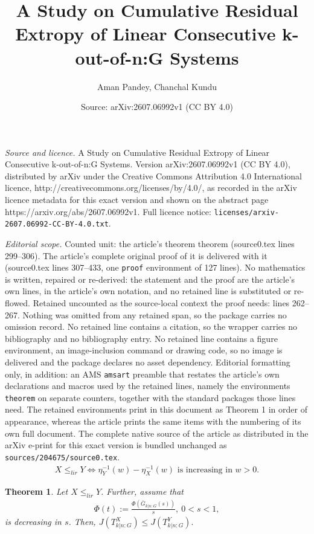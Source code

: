 \documentclass[10pt,a4paper]{amsart}
\title{A Study on Cumulative Residual Extropy of Linear Consecutive k-out-of-n:G Systems}
\author{Aman Pandey, Chanchal Kundu}
\date{Source: arXiv:2607.06992v1 (CC BY 4.0)}
\newtheorem{theorem}{Theorem}
\begin{document}
\maketitle

\noindent\emph{Source and licence.} A Study on Cumulative Residual Extropy of Linear Consecutive k-out-of-n:G Systems. Version arXiv:2607.06992v1 (CC BY 4.0), distributed by arXiv under the Creative Commons Attribution 4.0 International licence, http://creativecommons.org/licenses/by/4.0/, as recorded in the arXiv licence metadata for this exact version and shown on the abstract page https://arxiv.org/abs/2607.06992v1. Full licence notice: \texttt{licenses/arxiv-2607.06992-CC-BY-4.0.txt}.\par\smallskip

\noindent\textit{Editorial scope.} Counted unit: the article's theorem theorem (source0.tex lines 299--306). The article's complete original proof of it is delivered with it (source0.tex lines 307--433, one \texttt{proof} environment of 127 lines). No mathematics is written, repaired or re-derived: the statement and the proof are the article's own lines, in the article's own notation, and no retained line is substituted or re-flowed.  Retained uncounted as the source-local context the proof needs: lines 262--267.  Nothing was omitted from any retained span, so the package carries no omission record.  No retained line contains a citation, so the wrapper carries no bibliography and no bibliography entry.  No retained line contains a figure environment, an image-inclusion command or drawing code, so no image is delivered and the package declares no asset dependency.  Editorial formatting only, in addition: an AMS \texttt{amsart} preamble that restates the article's own declarations and macros used by the retained lines, namely the environments \texttt{theorem} on separate counters, together with the standard packages those lines need.  The retained environments print in this document as Theorem 1 in order of appearance, whereas the article prints the same items with the numbering of its own full document.  The complete native source of the article as distributed in the arXiv e-print for this exact version is bundled unchanged as \texttt{sources/204675/source0.tex}.
\begin{align}\label{eq2.4}
    X\leq_{lir}Y
    \iff
    \eta_Y^{-1}(w)-\eta_X^{-1}(w)
    \text{ is increasing in } w>0.
\end{align}

\begin{theorem}
Let $X\leq_{lir}Y$. Further, assume that
\begin{align*}
    \Phi(t):=
    \frac{\Phi(\bar G_{k|n:G}(s))}{s},~0<s<1,
\end{align*}
is decreasing in $s$. Then, $J(T_{k|n:G}^X)\leq J(T_{k|n:G}^Y).$
\end{theorem}
\end{document}
